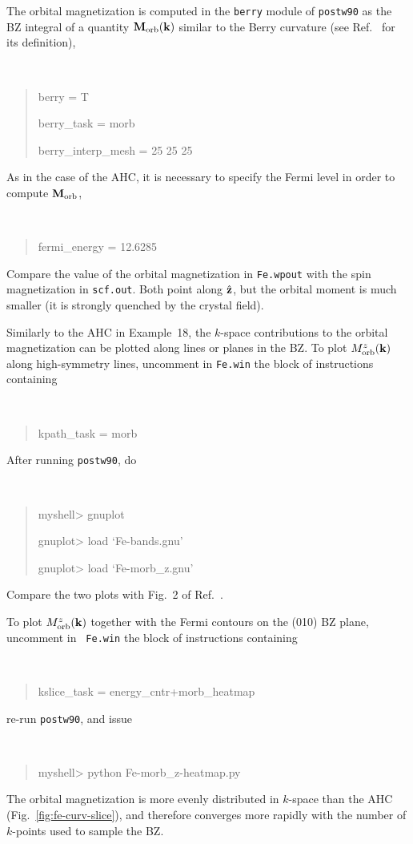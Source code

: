 \documentclass[a4paper,11pt,twoside]{article}
\begin{document}
The orbital magnetization is computed in the {\tt berry} module of
{\tt postw90} as the BZ integral of a quantity ${\bf M}_{\rm orb}({\bf
  k})$ similar to the Berry curvature (see Ref.~\cite{lopez-prb12} for
its definition), 
%
{\tt
\begin{quote}
berry = T

berry\_task = morb

berry\_interp\_mesh = 25 25 25

\end{quote} }

As in the case of the AHC, it is necessary to specify the Fermi level
in order to compute ${\bf M}_{\rm orb}$,
%
{\tt
\begin{quote}
fermi\_energy = 12.6285
\end{quote}
} 
%
Compare the value of the orbital magnetization in {\tt Fe.wpout}
with the spin magnetization in {\tt scf.out}. Both point along
$\hat{\bf z}$, but the orbital moment is much smaller (it is strongly
quenched by the crystal field).

Similarly to the AHC in Example~18, the $k$-space contributions to the
orbital magnetization can be plotted along lines or planes in the BZ.
To plot $M^z_{\rm orb}({\bf k})$ along high-symmetry lines, uncomment
in {\tt Fe.win} the block of instructions containing {\tt
\begin{quote}
kpath\_task = morb
\end{quote}
}
After running {\tt postw90}, do
{\tt
\begin{quote}
myshell> gnuplot

gnuplot> load `Fe-bands.gnu'

gnuplot> load `Fe-morb\_z.gnu'
\end{quote} }
Compare the two plots with Fig.~2 of Ref.~\cite{lopez-prb12}.


To plot $M^z_{\rm orb}({\bf k})$ together with the Fermi contours on the
(010) BZ plane, uncomment in {\tt
  Fe.win} the block of instructions containing 
{\tt
\begin{quote}
kslice\_task = energy\_cntr+morb\_heatmap
\end{quote}
} 
re-run {\tt postw90}, and issue
{\tt
\begin{quote}
myshell> python Fe-morb\_z-heatmap.py
\end{quote} } The orbital magnetization is more evenly distributed in
$k$-space than the AHC (Fig.~\ref{fig:fe-curv-slice}), and therefore
converges more rapidly with the number of $k$-points used to sample
the BZ.
\end{document}
